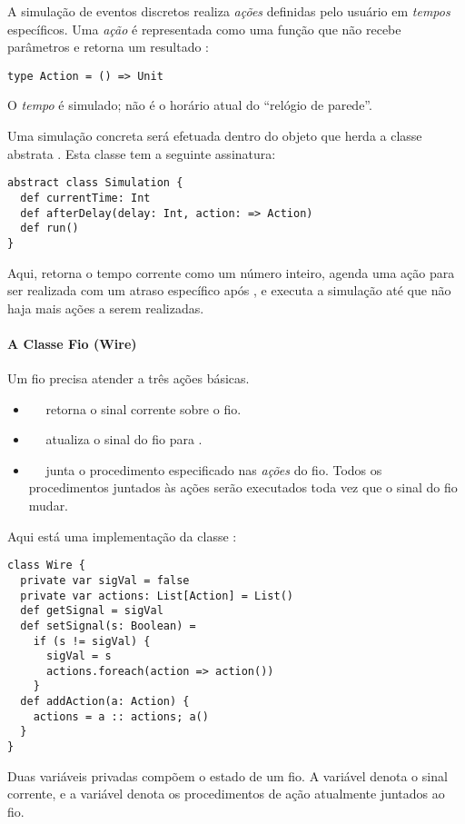 A simulação de eventos discretos realiza \emph{ações} definidas pelo
usuário em \emph{tempos} específicos.  Uma {\em ação} é representada
como uma função que não recebe parâmetros e retorna um
resultado :
\begin{lstlisting}
type Action = () => Unit
\end{lstlisting}
O \emph{tempo} é simulado; não é o horário atual do ``relógio de parede''.

Uma simulação concreta será efetuada dentro do objeto que herda a
classe abstrata . Esta classe tem a seguinte
assinatura:

\begin{lstlisting}
abstract class Simulation {
  def currentTime: Int
  def afterDelay(delay: Int, action: => Action)
  def run()
}
\end{lstlisting}
Aqui,
 retorna o tempo corrente como um número inteiro, 
 agenda uma ação para ser realizada com um atraso específico após , e 
 executa a simulação até que não haja mais ações a serem realizadas.

\paragraph{A Classe Fio (Wire)}
Um fio precisa atender a três ações básicas.
\begin{itemize}
\item[]
~~ retorna o sinal corrente sobre o fio.
\item[]
~~ atualiza o sinal do fio para .
\item[]
~~ junta o procedimento especificado  nas {\em ações} do fio. Todos os 
procedimentos juntados às ações serão executados toda vez que o sinal
do fio mudar.
\end{itemize}
Aqui está uma implementação da classe :
\begin{lstlisting}
class Wire {
  private var sigVal = false
  private var actions: List[Action] = List()
  def getSignal = sigVal
  def setSignal(s: Boolean) =
    if (s != sigVal) {
      sigVal = s
      actions.foreach(action => action())
    }
  def addAction(a: Action) {
    actions = a :: actions; a()
  }
}
\end{lstlisting}
Duas variáveis privadas compõem o estado de um fio. A variável  denota o sinal corrente, e a
variável  denota os procedimentos de ação atualmente juntados ao fio.

